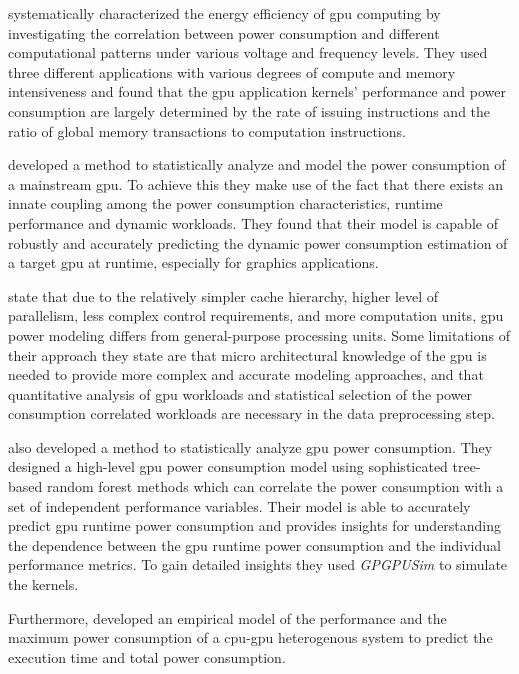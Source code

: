 			\textcite{Jiao2010} systematically characterized the energy efficiency of \gls{gpu} computing by investigating the correlation between power consumption and different computational patterns under various voltage and frequency levels.
			They used three different applications with various degrees of compute and memory intensiveness and found that the \gls{gpu} application kernels' performance and power consumption are largely determined by the rate of issuing instructions and the ratio of global memory transactions to computation instructions.

			\textcite{Ma2009} developed a method to statistically analyze and model the power consumption of a mainstream \gls{gpu}.
			To achieve this they make use of the fact that there exists an innate coupling among the power consumption characteristics, runtime performance and dynamic workloads.
			They found that their model is capable of robustly and accurately predicting the dynamic power consumption estimation of a target \gls{gpu} at runtime, especially for graphics applications.
			
			\textcite{Ma2009} state that due to the relatively simpler cache hierarchy, higher level of parallelism, less complex control requirements, and more computation units, \gls{gpu} power modeling differs from general-purpose processing units.
			Some limitations of their approach they state are that micro architectural knowledge of the \gls{gpu} is needed to provide more complex and accurate modeling approaches, and that quantitative analysis of \gls{gpu} workloads and statistical selection of the power consumption correlated workloads are necessary in the data preprocessing step.

			\textcite{Chen2011} also developed a method to statistically analyze \gls{gpu} power consumption.
			They designed a high-level \gls{gpu} power consumption model using sophisticated tree-based random forest methods which can correlate the power consumption with a set of independent performance variables.
			Their model is able to accurately predict \gls{gpu} runtime power consumption and provides insights for understanding the dependence between the \gls{gpu} runtime power consumption and the individual performance metrics.
			To gain detailed insights they used \emph{GPGPUSim} \parencite{Bakhoda2009} to simulate the kernels.

			Furthermore, \textcite{Komoda2013} developed an empirical model of the performance and the maximum power consumption of a \gls{cpu}-\gls{gpu} heterogenous system to predict the execution time and total power consumption.

